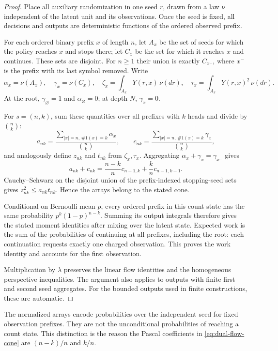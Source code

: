 \begin{proof}
Place all auxiliary randomization in one seed $r$, drawn from a law
$\nu$ independent of the latent unit and its observations. Once the
seed is fixed, all decisions and outputs are deterministic functions
of the ordered observed prefix.

For each ordered binary prefix $x$ of length $n$, let $A_x$ be the set
of seeds for which the policy reaches $x$ and stops there; let $C_x$
be the set for which it reaches $x$ and continues. These sets are
disjoint. For $n\ge1$ their union is exactly $C_{x^-}$, where $x^-$
is the prefix with its last symbol removed. Write
\[
 \alpha_x=\nu(A_x),\quad
 \gamma_x=\nu(C_x),\quad
 \zeta_x=\int_{A_x}Y(r,x)\,\nu(dr),\quad
 \tau_x=\int_{A_x}Y(r,x)^2\,\nu(dr).
\]
At the root, $\gamma_\varnothing=1$ and $\alpha_\varnothing=0$;
at depth $N$, $\gamma_x=0$.

For $s=(n,k)$, sum these quantities over all prefixes with $k$ heads
and divide by $\binom nk$:
\[
 a_{nk}=\frac{\sum_{|x|=n,\,\#1(x)=k}\alpha_x}{\binom nk},
 \qquad
 c_{nk}=\frac{\sum_{|x|=n,\,\#1(x)=k}\gamma_x}{\binom nk},
\]
and analogously define $z_{nk}$ and $t_{nk}$ from $\zeta_x,\tau_x$.
Aggregating $\alpha_x+\gamma_x=\gamma_{x^-}$ gives
\[
 a_{nk}+c_{nk}
 =\frac{n-k}{n}c_{n-1,k}
    +\frac{k}{n}c_{n-1,k-1}.
\]
Cauchy--Schwarz on the disjoint union of the prefix-indexed
stopping-seed sets
gives $z_{nk}^2\le a_{nk}t_{nk}$. Hence the arrays belong to the
stated cone.

Conditional on Bernoulli mean $p$, every ordered prefix in this
count state has the same probability $p^k(1-p)^{n-k}$.
Summing its output integrals therefore gives the stated moment
identities after mixing over the latent state. Expected work is the
sum of the probabilities of continuing at all prefixes, including
the root: each continuation requests exactly one charged observation.
This proves the work identity and accounts for the first observation.

Multiplication by $\lambda$ preserves the linear flow identities and
the homogeneous perspective inequalities. The argument also applies
to outputs with finite first and second seed aggregates. For the
bounded outputs used in finite constructions, these are automatic.
\end{proof}

The normalized arrays encode probabilities over the independent seed
for fixed observation prefixes. They are not the unconditional
probabilities of reaching a count state. This distinction is the
reason the Pascal coefficients in \eqref{eq:dual-flow-cone} are
$(n-k)/n$ and $k/n$.

